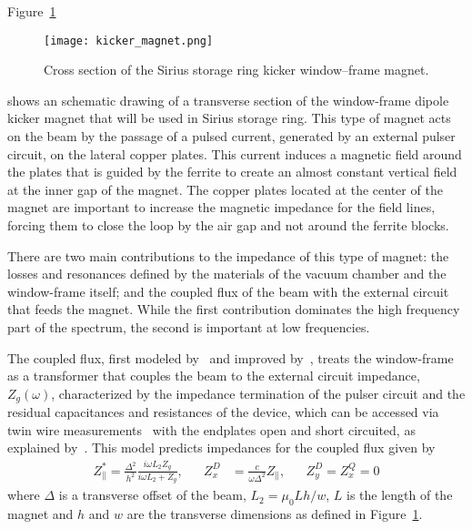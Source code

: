     Figure~\ref{fig:kicker_magnet}
    \begin{figure}
        \centering
        \texttt{[image: kicker\_magnet.png]}
        \caption{Cross section of the Sirius storage ring kicker window--frame magnet.}
        \label{fig:kicker_magnet}
    \end{figure}
    shows an schematic drawing of a transverse section of the window-frame dipole kicker magnet that will be used in Sirius storage ring. This type of magnet acts on the beam by the passage of a pulsed current, generated by an external pulser circuit, on the lateral copper plates. This current induces a magnetic field around the plates that is guided by the ferrite to create an almost constant vertical field at the inner gap of the magnet. The copper plates located at the center of the magnet are important to increase the magnetic impedance for the field lines, forcing them to close the loop by the air gap and not around the ferrite blocks.

    There are two main contributions to the impedance of this type of magnet: the losses and resonances defined by the materials of the vacuum chamber and the window-frame itself; and the coupled flux of the beam with the external circuit that feeds the magnet. While the first contribution dominates the high frequency part of the spectrum, the second is important at low frequencies.

    The coupled flux, first modeled by~ and improved by~, treats the window-frame as a transformer that couples the beam to the external circuit impedance, $Z_g(\omega)$, characterized by the impedance termination of the pulser circuit and the residual capacitances and resistances of the device, which can be accessed via twin wire measurements~\cite{Mostacci2016} with the endplates open and short circuited, as explained by~. This model predicts impedances for the coupled flux given by
    \begin{align}\label{eq:coupled_flux_impedance}
        Z_\parallel^* = \frac{\Delta^2}{h^2}\frac{i\omega L_2 Z_g}{i\omega L_2 + Z_g},
        & & Z_x^D &= \frac{c}{\omega\Delta^2}Z_\parallel, & & Z^D_y=Z^Q_x = 0
    \end{align}
    where $\Delta$ is a transverse offset of the beam, $L_2 = \mu_0Lh/w$, $L$ is the length of the magnet and $h$ and $w$ are the transverse dimensions as defined in Figure~\ref{fig:kicker_magnet}.

